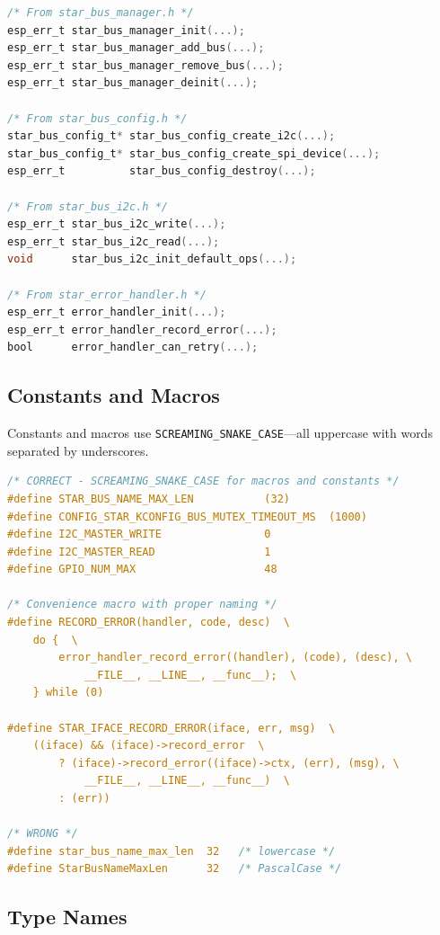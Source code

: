 \begin{lstlisting}[language=C]
/* From star_bus_manager.h */
esp_err_t star_bus_manager_init(...);
esp_err_t star_bus_manager_add_bus(...);
esp_err_t star_bus_manager_remove_bus(...);
esp_err_t star_bus_manager_deinit(...);

/* From star_bus_config.h */
star_bus_config_t* star_bus_config_create_i2c(...);
star_bus_config_t* star_bus_config_create_spi_device(...);
esp_err_t          star_bus_config_destroy(...);

/* From star_bus_i2c.h */
esp_err_t star_bus_i2c_write(...);
esp_err_t star_bus_i2c_read(...);
void      star_bus_i2c_init_default_ops(...);

/* From star_error_handler.h */
esp_err_t error_handler_init(...);
esp_err_t error_handler_record_error(...);
bool      error_handler_can_retry(...);
\end{lstlisting}

\subsection{Constants and Macros}

Constants and macros use \texttt{SCREAMING\_SNAKE\_CASE}---all uppercase with words separated by underscores.

\begin{lstlisting}[language=C]
/* CORRECT - SCREAMING_SNAKE_CASE for macros and constants */
#define STAR_BUS_NAME_MAX_LEN           (32)
#define CONFIG_STAR_KCONFIG_BUS_MUTEX_TIMEOUT_MS  (1000)
#define I2C_MASTER_WRITE                0
#define I2C_MASTER_READ                 1
#define GPIO_NUM_MAX                    48

/* Convenience macro with proper naming */
#define RECORD_ERROR(handler, code, desc)  \
    do {  \
        error_handler_record_error((handler), (code), (desc), \
            __FILE__, __LINE__, __func__);  \
    } while (0)

#define STAR_IFACE_RECORD_ERROR(iface, err, msg)  \
    ((iface) && (iface)->record_error  \
        ? (iface)->record_error((iface)->ctx, (err), (msg), \
            __FILE__, __LINE__, __func__)  \
        : (err))

/* WRONG */
#define star_bus_name_max_len  32   /* lowercase */
#define StarBusNameMaxLen      32   /* PascalCase */
\end{lstlisting}

\subsection{Type Names}

